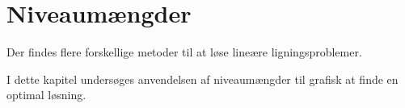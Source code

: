 \chapter{Niveaumængder}	
Der findes flere forskellige metoder til at løse lineære ligningsproblemer. 

I dette kapitel undersøges anvendelsen af niveaumængder til grafisk at finde en optimal løsning.





%


%
%

